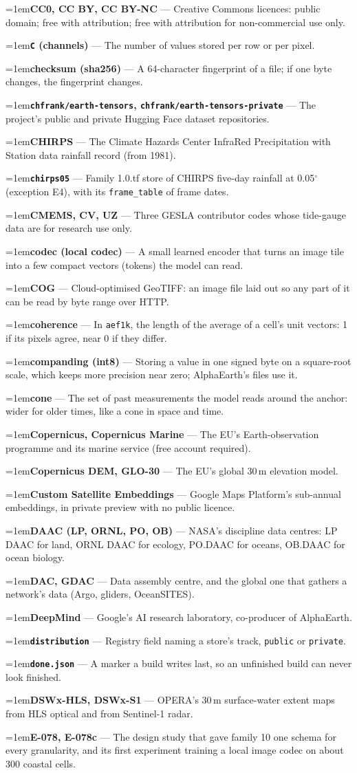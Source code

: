 \documentclass[10pt]{article}
\newcommand{\code}[1]{\texttt{#1}}
\newcommand{\gl}[2]{\par\hangindent=1em\hangafter=1\textbf{#1} --- #2\par}
\begin{document}
\gl{CC0, CC BY, CC BY-NC}{Creative Commons licences: public domain; free with attribution; free with attribution for non-commercial use only.}
\gl{\code{C} (channels)}{The number of values stored per row or per pixel.}
\gl{checksum (sha256)}{A 64-character fingerprint of a file; if one byte changes, the fingerprint changes.}
\gl{\code{chfrank/earth-tensors}, \code{chfrank/earth-tensors-private}}{The project's public and private Hugging Face dataset repositories.}
\gl{CHIRPS}{The Climate Hazards Center InfraRed Precipitation with Station data rainfall record (from 1981).}
\gl{\code{chirps05}}{Family 1.0.tf store of CHIRPS five-day rainfall at 0.05$^\circ$ (exception E4), with its \code{frame\_table} of frame dates.}
\gl{CMEMS, CV, UZ}{Three GESLA contributor codes whose tide-gauge data are for research use only.}
\gl{codec (local codec)}{A small learned encoder that turns an image tile into a few compact vectors (tokens) the model can read.}
\gl{COG}{Cloud-optimised GeoTIFF: an image file laid out so any part of it can be read by byte range over HTTP.}
\gl{coherence}{In \code{aef1k}, the length of the average of a cell's unit vectors: 1 if its pixels agree, near 0 if they differ.}
\gl{companding (int8)}{Storing a value in one signed byte on a square-root scale, which keeps more precision near zero; AlphaEarth's files use it.}
\gl{cone}{The set of past measurements the model reads around the anchor: wider for older times, like a cone in space and time.}
\gl{Copernicus, Copernicus Marine}{The EU's Earth-observation programme and its marine service (free account required).}
\gl{Copernicus DEM, GLO-30}{The EU's global 30\,m elevation model.}
\gl{Custom Satellite Embeddings}{Google Maps Platform's sub-annual embeddings, in private preview with no public licence.}
\gl{DAAC (LP, ORNL, PO, OB)}{NASA's discipline data centres: LP DAAC for land, ORNL DAAC for ecology, PO.DAAC for oceans, OB.DAAC for ocean biology.}
\gl{DAC, GDAC}{Data assembly centre, and the global one that gathers a network's data (Argo, gliders, OceanSITES).}
\gl{DeepMind}{Google's AI research laboratory, co-producer of AlphaEarth.}
\gl{\code{distribution}}{Registry field naming a store's track, \code{public} or \code{private}.}
\gl{\code{done.json}}{A marker a build writes last, so an unfinished build can never look finished.}
\gl{DSWx-HLS, DSWx-S1}{OPERA's 30\,m surface-water extent maps from HLS optical and from Sentinel-1 radar.}
\gl{E-078, E-078c}{The design study that gave family 10 one schema for every granularity, and its first experiment training a local image codec on about 300 coastal cells.}
\end{document}
